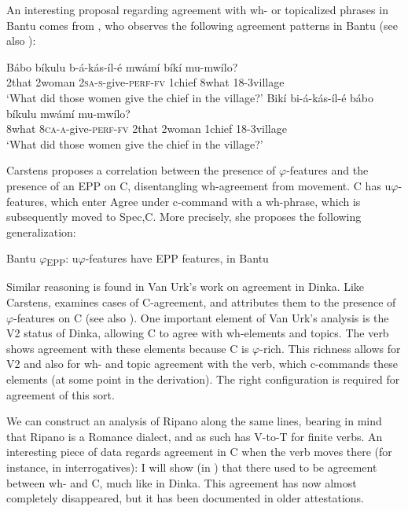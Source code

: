\documentclass[output=paper
,modfonts
,nonflat]{langsci/langscibook}
\begin{document}
An interesting proposal regarding agreement with wh- or topicalized phrases in Bantu comes from \citet{Carstens2005a}, who observes the following agreement patterns in Bantu (see also ):

\begin{exe}
\ex \citet[220]{Carstens2005a} \xlist
\ex
\gll Bábo bíkulu   b-á-kás-íl-é     mwámí bíkí mu-mwílo?\\
	2that   2woman   \textsc{2sa-s}{}-give-\textsc{perf-fv} 1chief 8what  18-3village\\ 
\glt `What did those women give the chief in the village?'
\ex
\gll Bikí   bi-á-kás-íl-é   bábo bíkulu   mwámí   mu-mwílo?\\
	8what   \textsc{8ca-a-}give-\textsc{perf-fv} 2that 2woman 1chief 18-3village \\
\glt `What did those women give the chief in the village?'
\endxlist
\end{exe}
Carstens proposes a correlation between the presence of $\varphi $-features and the presence of an EPP on C, disentangling wh-agreement from movement. C has u$\varphi $-features, which enter Agree under c-command with a wh-phrase, which is subsequently moved to Spec,C. More precisely, she proposes the following generalization:

\begin{exe}
\ex Bantu $\varphi $\textsubscript{EPP}: u$\varphi $-features have EPP features, in Bantu \citep[222]{Carstens2005a}
\end{exe}
Similar reasoning is found in Van Urk’s work on agreement in Dinka. Like Carstens, \citet{Van_Urk2015} examines cases of C-agreement, and attributes them to the presence of $\varphi $-features on C (see also \citealt{Haegeman_Van_Koppen2012}). One important element of Van Urk’s analysis is the V2 status of Dinka, allowing C to agree with wh-elements and topics. The verb shows agreement with these elements because C is $\varphi $-rich. This richness allows for V2 and also for wh- and topic agreement with the verb, which c-commands these elements (at some point in the derivation). The right configuration is required for agreement of this sort.

We can construct an analysis of Ripano along the same lines, bearing in mind that Ripano is a Romance dialect, and as such has V-to-T for finite verbs. An interesting piece of data regards agreement in C when the verb moves there (for instance, in interrogatives): I will show (in ) that there used to be agreement between wh- and C, much like in Dinka. This agreement has now almost completely disappeared, but it has been documented in older attestations.
\end{document}
